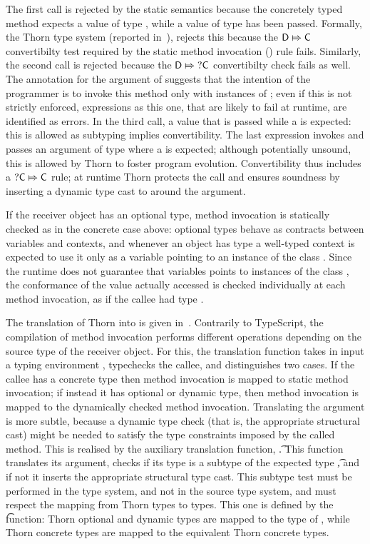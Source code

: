 \documentclass[acmlarge, anonymous, authordraft, review]{acmart} %
\begin{document}
\noindent The first call is rejected by the static semantics because the concretely typed method \n expects a value of type \C, while a value of type \D has been passed.  Formally, the Thorn type system (reported in~), rejects this because the \(\D\Mapsto\C\) convertibilty test required by the static method invocation () rule fails.  Similarly, the second call is rejected because the \(\D\Mapsto\dt\C\) convertibilty check fails as well.  The \dt\C annotation for the argument of \m suggests that the intention of the programmer is to invoke this  method only with instances of \C; even if this is not strictly enforced, expressions as this one, that are likely to fail at runtime, are identified as errors.
In the third call, a \C value that is passed while a \dt\C is expected: this is allowed as subtyping implies convertibility.  The last expression invokes \n and passes an argument of type \dt\C where a \C is expected; although potentially unsound, this is allowed by Thorn to foster program evolution.  Convertibility thus includes a \(\dt\C\Mapsto\C\) rule; at runtime Thorn protects the call and ensures soundness by inserting a dynamic type cast to \C around the argument.

If the receiver object has an optional type,  method invocation is statically checked as in the concrete case above:
 optional types behave as contracts between variables and contexts, and whenever an object has type \dt\C a well-typed context is expected to use it only as a variable pointing to an instance of the class \C.  Since the runtime does not guarantee that  \dt\C variables points to instances of the class \C, the conformance of the value actually accessed is checked individually at each method invocation, as if the callee had type \any.  
 



 The translation of Thorn into \kafka is given in~.  Contrarily to TypeScript, the compilation of method invocation performs different operations depending on the source type of the receiver object. For this, the translation function \Env takes in input a typing environment \Env, typechecks the callee, and distinguishes two cases.  If the callee has a concrete type then method invocation is mapped to static method invocation; if instead it has optional or dynamic type, then method invocation is mapped to the dynamically checked method invocation.  Translating the argument is more subtle, because a dynamic type check (that is, the appropriate structural cast) might be needed to satisfy the type constraints imposed by the called method.
  This is realised by the auxiliary translation function, \Env\t.  This function translates its argument, checks if its type is a subtype of the expected type \t, and if not it inserts the appropriate structural type cast.  This subtype test must be performed in the \kafka type system, and not in the source type system, and must respect the mapping from Thorn types to \kafka types.  This one is defined by the \kty\t function: Thorn optional and dynamic types are mapped to the \any type of \kafka, while Thorn concrete types are mapped to the equivalent Thorn concrete types.
 
\end{document}
